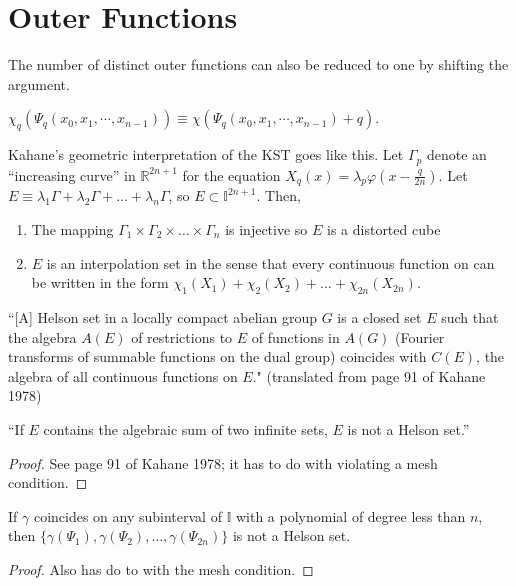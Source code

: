 \chapter{Outer Functions}\label{ch:OuterFunctions}

The number of distinct outer functions can also be reduced to one by shifting the argument.
\begin{definition}
  \label{def:outer}
  $\chi_q\left(\Psi_q\left(x_0, x_1, \cdots, x_{n - 1}\right)\right) \equiv \chi\left(\Psi_q\left(x_0, x_1, \cdots, x_{n - 1}\right) + q\right)$.
\end{definition}

Kahane's geometric interpretation of the KST goes like this. Let $\Gamma_p$ denote an ``increasing curve'' in $\mathbb{R}^{2n + 1}$ for the equation $X_q\left(x\right) = \lambda_p \varphi\left(x - \frac{q}{2n}\right)$. Let $E \equiv \lambda_1 \Gamma + \lambda_2 \Gamma + \dots + \lambda_n \Gamma$, so $E \subset \mathbb{I}^{2n + 1}$. Then,
\begin{enumerate}
  \item The mapping $\Gamma_1 \times \Gamma_2 \times \dots \times \Gamma_n$ is injective so $E$ is a distorted cube
  \item $E$ is an interpolation set in the sense that every continuous function on can be written in the form $\chi_1\left(X_1\right) + \chi_2\left(X_2\right) + \dots + \chi_{2n}\left(X_{2n}\right)$.
\end{enumerate}

\begin{definition}
  \label{def:Helson_set}
``[A] Helson set in a locally compact abelian group $G$ is a closed set $E$ such that the algebra $A(E)$ of restrictions to $E$ of functions in $A(G)$ (Fourier transforms of summable functions on the dual group) coincides with $C(E)$, the algebra of all continuous functions on $E$." (translated from page 91 of Kahane 1978) 
\end{definition}

\begin{lemma}
  \label{lem:not_Helson}
  ``If $E$ contains the algebraic sum of two infinite sets, $E$ is not a Helson set.''
\end{lemma}
\begin{proof}
  See page 91 of Kahane 1978; it has to do with violating a mesh condition.
\end{proof}

\begin{lemma}
  \label{lem:polynomial}
  If $\gamma$ coincides on any subinterval of $\mathbb{I}$ with a polynomial of degree less than $n$, then $\{\gamma\left(\Psi_1\right), \gamma\left(\Psi_2\right), \dots, \gamma\left(\Psi_{2n}\right)\}$ is not a Helson set.
\end{lemma}
\begin{proof}
  Also has do to with the mesh condition.
\end{proof}

